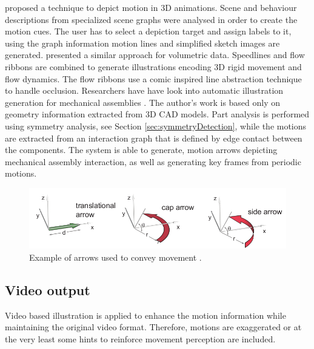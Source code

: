 \cite{Nienhaus2005} proposed a technique to depict motion in 3D animations.
Scene and behaviour descriptions from specialized scene graphs were analysed in order to create the motion cues.
The user has to select a depiction target and assign labels to it, using the graph information motion lines and simplified sketch images are generated.
\cite{Joshi2005} presented a similar approach for volumetric data.
Speedlines and flow ribbons are combined to generate illustrations encoding 3D rigid movement and flow dynamics.
The flow ribbons use a comic inspired line abstraction technique to handle occlusion.
Researchers have have look into automatic illustration generation for mechanical assemblies \cite{Mitra2010}.
The author's work is based only on geometry information extracted from 3D CAD models.
Part analysis is performed using symmetry analysis, see Section \ref{sec:symmetryDetection}, while the motions are extracted from an interaction graph that is defined by edge contact between the components.
The system is able to generate, motion arrows depicting mechanical assembly interaction, as well as generating key frames from periodic motions.

\begin{figure}[htbp]
	\centering
	\includegraphics[scale=.5]{images/arrow_types2}
	\caption{Example of arrows used to convey movement \cite{Mitra2010}.}
	\label{fig:arrowTypes}
\end{figure}

\subsection{Video output}

Video based illustration is applied to enhance the motion information while maintaining the original video format.
Therefore, motions are exaggerated or at the very least some hints to reinforce movement perception are included.

